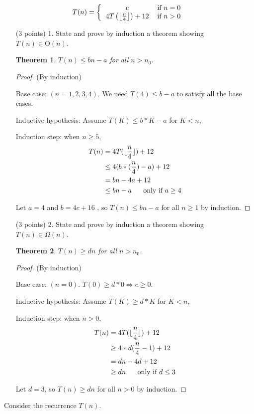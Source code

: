 \documentclass[paper=a4, fontsize=11pt]{scrartcl}
\DeclarePairedDelimiter\floor{\lfloor}{\rfloor}
\newtheorem{theorem}{Theorem}
\numberwithin{equation}{section}		%
\numberwithin{figure}{section}			%
\numberwithin{table}{section}				%
\begin{document}
\[
T(n) = \left\{
\begin{tabular}{cc}
c & \text{if} $n=0$ \\
$4T\left(\left\lfloor\frac{n}{4}\right\rfloor\right)+12$ & \text{if} $n>0$ \\
\end{tabular}\right.
\]
\begin{enumerate}
	


\item [(3 points) 1.] State and prove by induction a theorem showing $T(n)\in\text{O}(n)$.

\begin{theorem}
	$T(n) \leq bn-a$ for all $n>n_0$.
\end{theorem}
\begin{proof}(By induction)
	
	Base case: $(n = 1,2,3,4)$.
	We need $T(4) \leq b -a$ to satisfy all the base cases. 
	
	Inductive hypothesis: Assume $T(K) \leq b*K - a$ for $K<n$,
	
	Induction step: when $n\geq 5$, 
	\begin{align*}
		T(n) &= 4T(\floor{\frac{n}{4}}) + 12 \\
		&\leq 4(b*(\frac{n}{4}) - a) + 12 \\
		&= bn - 4a + 12 \\
		&\leq bn - a \ \ \ \ \text{ only if } a \geq 4
	\end{align*}
	
	Let $a = 4$ and $b = 4c + 16$ , so $T(n) \leq bn - a$ for all $n \geq 1$ by induction.
\end{proof}

\item [(3 points) 2.] State and prove by induction a theorem showing $T(n)\in\Omega(n)$.
\begin{theorem}
	$T(n) \geq dn$ for all $n>n_0$.
\end{theorem}
\begin{proof}(By induction)
	
	Base case: $(n = 0)$.
	$T(0) \geq d*0 \Rightarrow c \geq 0$.  
	
	Inductive hypothesis: Assume $T(K) \geq d*K$ for $K<n$,
	
	Induction step: when $n>0$,
	\begin{align*}
	T(n) &= 4T(\floor{\frac{n}{4}}) + 12 \\
	&\geq 4*d(\frac{n}{4}-1) + 12 \\
	&= dn -4d + 12 \\
	&\geq dn \ \ \ \ \text{ only if } d \leq 3
	\end{align*}
	
	Let $d = 3$, so $T(n) \geq dn$ for all $n > 0$ by induction.
\end{proof}



\end{enumerate}
Consider the recurrence $T(n)$.  
\end{document}
